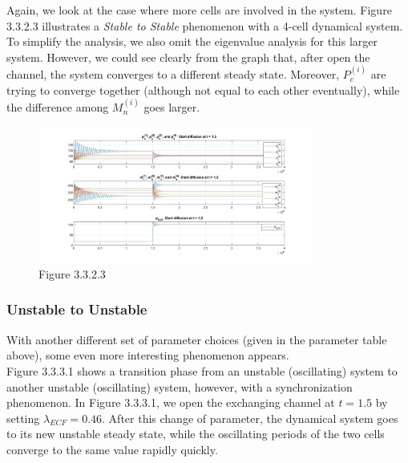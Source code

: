 \documentclass[12pt]{article}
\renewcommand{\(}{\left (}
\renewcommand{\)}{\right )}
\begin{document}
Again, we look at the case where more cells are involved in the system. Figure 3.3.2.3 illustrates a \textit{Stable to Stable} phenomenon with a 4-cell dynamical system. To simplify the analysis, we also omit the eigenvalue analysis for this larger system. However, we could see clearly from the graph that, after open the channel, the system converges to a different steady state. Moreover, $P_{c}^{(i)}$ are trying to converge together (although not equal to each other eventually), while the difference among $M_{n}^{(i)}$ goes larger. \\
\begin{figure}[h!]
    \centering
	\begin{minipage}{0.99\textwidth}
		\centering
		\includegraphics[width=0.8\textwidth]{SS_M.jpg}
		\caption*{\small Figure 3.3.2.3}
	\end{minipage}
\end{figure}


\subsubsection{Unstable to Unstable}
\hspace{5mm} With another different set of parameter choices (given in the parameter table above), some even more interesting phenomenon appears. \\

Figure 3.3.3.1 shows a transition phase from an unstable (oscillating) system to another unstable (oscillating) system, however, with a synchronization phenomenon. In Figure 3.3.3.1, we open the exchanging channel at $t = 1.5$ by setting $\lambda_{ECF} = 0.46$. After this change of parameter, the dynamical system goes to its new unstable steady state, while the oscillating periods of the two cells converge to the same value rapidly quickly. \\
\end{document}
